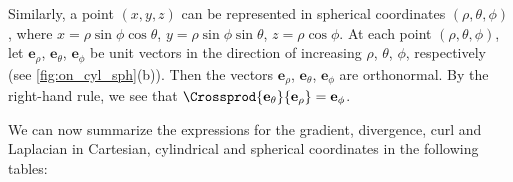 Similarly, a point $(x,y,z)$ can be represented in spherical coordinates $(\rho, \theta , \phi)$, where $x=\rho\sin \phi \cos \theta$, $y=\rho\sin \phi \sin \theta$, $z=\rho\cos \phi$. At each point $(\rho, \theta , \phi)$, let $\textbf{e}_{\rho}$, $\textbf{e}_{\theta}$, $\textbf{e}_{\phi}$ be unit vectors in the direction of increasing $\rho$, $\theta$, $\phi$, respectively (see \autoref{fig:on_cyl_sph}(b)). Then the vectors $\textbf{e}_{\rho}$, $\textbf{e}_{\theta}$, $\textbf{e}_{\phi}$ are orthonormal. By the right-hand rule, we see that $\Crossprod{\textbf{e}_{\theta}}{\textbf{e}_{\rho}}=\textbf{e}_{\phi}$.

We can now summarize the expressions for the gradient, divergence, curl and Laplacian in Cartesian, cylindrical and spherical coordinates in the following tables:


